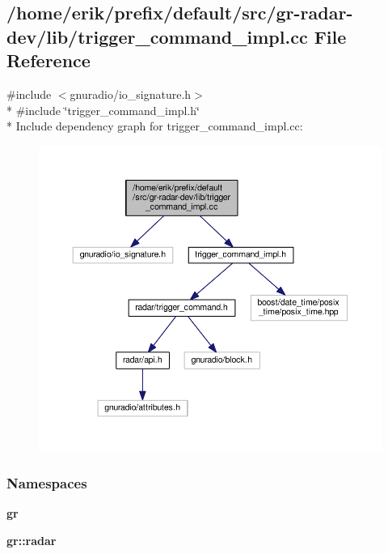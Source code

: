 \subsection{/home/erik/prefix/default/src/gr-\/radar-\/dev/lib/trigger\+\_\+command\+\_\+impl.cc File Reference}
\label{trigger__command__impl_8cc}
{\ttfamily \#include $<$gnuradio/io\+\_\+signature.\+h$>$}\\*
{\ttfamily \#include \char`\"{}trigger\+\_\+command\+\_\+impl.\+h\char`\"{}}\\*
Include dependency graph for trigger\+\_\+command\+\_\+impl.\+cc\+:
\nopagebreak
\begin{figure}[H]
\begin{center}
\leavevmode
\includegraphics[width=350pt]{d0/d13/trigger__command__impl_8cc__incl}
\end{center}
\end{figure}
\subsubsection*{Namespaces}
\begin{DoxyCompactItemize}
\item 
 {\bf gr}
\item 
 {\bf gr\+::radar}
\end{DoxyCompactItemize}
